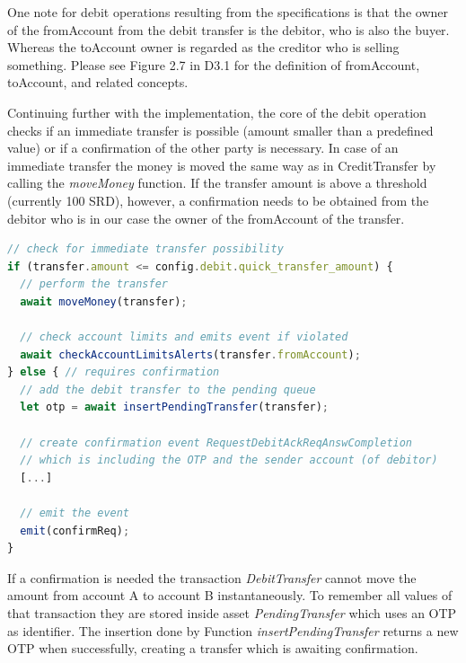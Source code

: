 One note for debit operations resulting from the specifications is that the owner of the fromAccount from the debit transfer is the debitor, who is also the buyer. Whereas the toAccount owner is regarded as the creditor who is selling something. Please see Figure 2.7 in D3.1 \cite{INTERLACE_D31} for the definition of fromAccount, toAccount, and related concepts.

Continuing further with the implementation, the core of the debit operation checks if an immediate transfer is possible (amount smaller than a predefined value) or if a confirmation of the other party is necessary. In case of an immediate transfer the money is moved the same way as in CreditTransfer by calling the \textit{moveMoney} function. If the transfer amount is above a threshold (currently 100 SRD), however, a confirmation needs to be obtained from the debitor who is in our case the owner of the fromAccount of the transfer.

\begin{center}
\begin{minipage}{0.8\textwidth}
\small
\begin{lstlisting}[language=javascript,firstnumber=1,caption={\bf\small DebitTransfer JavaScript}, captionpos=b,label=lst:js-debittransfer]
// check for immediate transfer possibility
if (transfer.amount <= config.debit.quick_transfer_amount) {
  // perform the transfer
  await moveMoney(transfer);

  // check account limits and emits event if violated
  await checkAccountLimitsAlerts(transfer.fromAccount);
} else { // requires confirmation
  // add the debit transfer to the pending queue
  let otp = await insertPendingTransfer(transfer);

  // create confirmation event RequestDebitAckReqAnswCompletion
  // which is including the OTP and the sender account (of debitor)
  [...]

  // emit the event
  emit(confirmReq);
}
\end{lstlisting}
\end{minipage}
\end{center}

If a confirmation is needed the transaction \textit{DebitTransfer} cannot move the amount from account A to account B instantaneously. To remember all values of that transaction they are stored inside asset \textit{PendingTransfer} which uses an OTP as identifier. The insertion done by Function \textit{insertPendingTransfer} returns a new OTP when successfully, creating a transfer which is awaiting confirmation.

